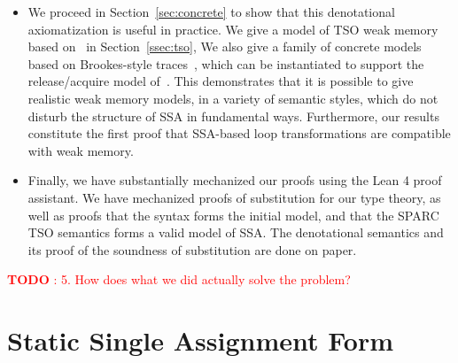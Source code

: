 \documentclass[acmsmall,screen,review]{acmart}
\newcounter{todos}
\newcommand{\todo}[1]{\stepcounter{todos} \textcolor{red}{\textbf{TODO \arabic{todos}}: #1}}
\newcommand{\ms}[1]{\ensuremath{\mathsf{#1}}}
\newcommand{\isotopessa}{\(\lambda_{\ms{SSA}}\)}
\begin{document}
\begin{itemize}
\item We proceed in Section~\ref{sec:concrete} to show that this
  denotational axiomatization is useful in practice. We give a model
  of TSO weak memory based on~\citet{sparky} in
  Section~\ref{ssec:tso}, We also give a family of concrete models
  based on Brookes-style traces~\cite{brookes-traces}, which can be
  instantiated to support the release/acquire model
  of~\citet{kammar-dvir}. This demonstrates that it is possible to
  give realistic weak memory models, in a variety of semantic styles,
  which do not disturb the structure of SSA in fundamental ways.
  Furthermore, our results constitute the first proof that SSA-based loop transformations
  are compatible with weak memory. 

\item Finally, we have substantially mechanized our proofs using the Lean 4 proof assistant. We have
  mechanized proofs of substitution for our type theory, as well as proofs that the syntax forms the
  initial model, and that the SPARC TSO semantics forms a valid model of SSA. The denotational
  semantics and its proof of the soundness of substitution are done on paper. 
\end{itemize}


\todo{5. How does what we did actually solve the problem?}

\section{Static Single Assignment Form}

\end{document}
